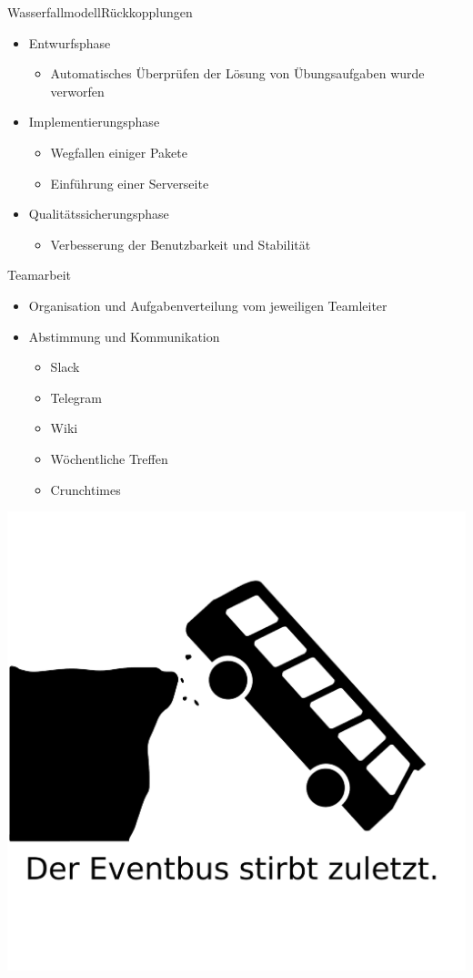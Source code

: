 \documentclass[10pt]{beamer}
\begin{document}
\begin{frame}{Wasserfallmodell}{Rückkopplungen}
\begin{itemize}
	\item Entwurfsphase
	\begin{itemize}
			\item Automatisches Überprüfen der Lösung von Übungsaufgaben wurde verworfen
	\end{itemize}
	\item Implementierungsphase
	\begin{itemize}
		\item Wegfallen einiger Pakete
		\item Einführung einer Serverseite
	\end{itemize}
	\item Qualitätssicherungsphase
	\begin{itemize}
		\item Verbesserung der Benutzbarkeit und Stabilität
	\end{itemize}
\end{itemize}
\end{frame}


\begin{frame}{Teamarbeit}{}
	\begin{itemize}
		\item Organisation und Aufgabenverteilung vom jeweiligen Teamleiter
		\item Abstimmung und Kommunikation
		\begin{itemize}
			\item Slack
			\item Telegram
			\item Wiki
			\item Wöchentliche Treffen
			\item Crunchtimes
		\end{itemize}
	\end{itemize}
\end{frame}

{\1
\begin{frame}
  \includegraphics[width = \textwidth]{img/eventbus}
\end{frame}}
\end{document}
